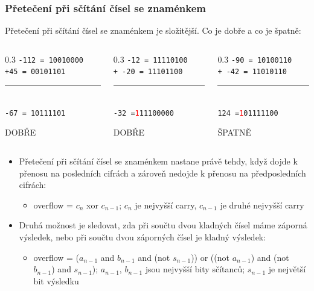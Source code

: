 \begin{frame}
\frametitle{Přetečení při sčítání čísel se znaménkem}

Přetečení při sčítání čísel se znaménkem je složitější. Co je dobře a co je špatně:
\bigskip
\begin{columns}
\begin{column}{0.3\textwidth}
\texttt{-112 = 10010000}\\
\texttt{+\phantom{x}45 = 00101101}\\
\vspace{-8pt}
\rule[0pt]{3cm}{0.1pt}\\
\texttt{\phantom{x}-67 = 10111101}\\
\begin{center}
\large DOBŘE
\end{center}
\end{column}
\hfill
\begin{column}{0.3\textwidth}
\texttt{\phantom{xx}-12 = 11110100}\\
\texttt{+ -20 = 11101100}\\
\vspace{-8pt}
\rule[0pt]{3cm}{0.1pt}\\
\texttt{\phantom{xx}-32 =\textcolor{red}{1}11100000}\\
\begin{center}
\large DOBŘE
\end{center}
\end{column}
\hfill
\begin{column}{0.3\textwidth}
\texttt{\phantom{xx}-90 = 10100110}\\
\texttt{+ -42 = 11010110}\\
\vspace{-8pt}
\rule[0pt]{3cm}{0.1pt}\\
\texttt{\phantom{xx}124 =\textcolor{red}{1}01111100}\\
\begin{center}
\large ŠPATNĚ
\end{center}
\end{column}
\end{columns}
\bigskip
\begin{itemize}
\item Přetečení při sčítání čísel se znaménkem nastane právě tehdy, když dojde k přenosu na posledních cifrách a zároveň nedojde k přenosu na předposledních cifrách:
\begin{itemize}
\item overflow = $c_n$ xor $c_{n-1}$; $c_n$ je nejvyšší carry, $c_{n-1}$ je druhé nejvyšší carry
\end{itemize}
\item Druhá možnost je sledovat, zda při součtu dvou kladných čísel máme záporná výsledek, nebo při součtu dvou záporných čísel je kladný výsledek:
\begin{itemize}
\item overflow = ($a_{n-1}$ and  $b_{n-1}$ and (not $s_{n-1}$)) or ((not $a_{n-1}$) and  (not $b_{n-1}$) and $s_{n-1}$); $a_{n-1}$, $b_{n-1}$ jsou nejvyšší bity sčítanců; $s_{n-1}$ je největší bit výsledku
\end{itemize}
\end{itemize}
\end{frame}


